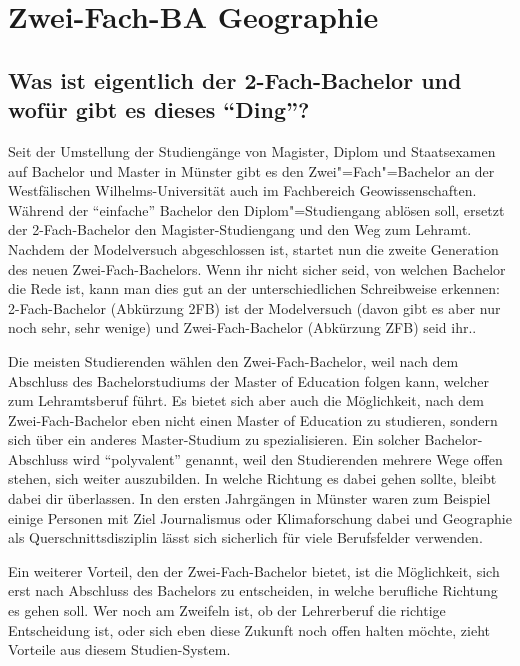 \chapter{Zwei-Fach-BA Geographie}

\section*{Was ist eigentlich der 2-Fach-Bachelor und wofür gibt es dieses "`Ding"'?}
Seit der Umstellung der Studiengänge von Magister, Diplom und Staatsexamen auf Bachelor und Master in Münster gibt es den Zwei"=Fach"=Bachelor an der Westfälischen Wilhelms-Universität auch im Fachbereich Geowissenschaften. Während der "`einfache"' Bachelor den Diplom"=Studiengang ablösen soll, ersetzt der 2-Fach-Bachelor den Magister-Studiengang und den Weg zum Lehramt. Nachdem der Modelversuch abgeschlossen ist, startet nun die zweite Generation des neuen Zwei-Fach-Bachelors. Wenn ihr nicht sicher seid, von welchen Bachelor die Rede ist, kann man dies gut an der unterschiedlichen Schreibweise erkennen: 2-Fach-Bachelor (Abkürzung 2FB) ist der Modelversuch (davon gibt es aber nur noch sehr, sehr wenige) und Zwei-Fach-Bachelor (Abkürzung ZFB) seid ihr.. 

Die meisten Studierenden wählen den Zwei-Fach-Bachelor, weil nach dem Abschluss des Bachelorstudiums der Master of Education folgen kann, welcher zum Lehramtsberuf führt. Es bietet sich aber auch die Möglichkeit, nach dem Zwei-Fach-Bachelor eben nicht einen Master of Education zu studieren, sondern sich über ein anderes Master-Studium zu spezialisieren. Ein solcher Bachelor-Abschluss wird "`polyvalent"' genannt, weil den Studierenden mehrere Wege offen stehen, sich weiter auszubilden. In welche Richtung es dabei gehen sollte, bleibt dabei dir überlassen. In den ersten Jahrgängen in Münster waren zum Beispiel einige Personen mit Ziel Journalismus oder Klimaforschung dabei und Geographie als Querschnittsdisziplin lässt sich sicherlich für viele Berufsfelder verwenden.

Ein weiterer Vorteil, den der Zwei-Fach-Bachelor bietet, ist die Möglichkeit, sich erst nach Abschluss des Bachelors zu entscheiden, in welche berufliche Richtung es gehen soll. Wer noch am Zweifeln ist, ob der Lehrerberuf die richtige Entscheidung ist, oder sich eben diese Zukunft noch offen halten möchte, zieht Vorteile aus diesem Studien-System.

